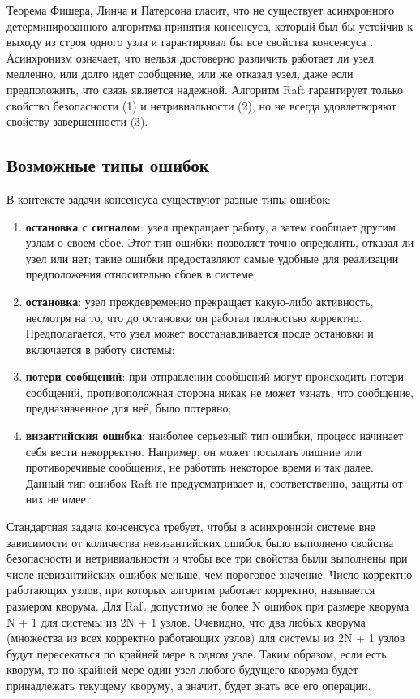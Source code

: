 \documentclass[subf, href, colorlinks=true, 14pt,
times, mtpro, specialist]{disser}
\theoremstyle{definition}
\begin{document}
Теорема Фишера, Линча и Патерсона гласит, что не существует асинхронного детерминированного алгоритма принятия консенсуса, который был бы устойчив к выходу из строя одного узла и гарантировал бы все свойства консенсуса \cite{Theorem_FLP}. Асинхронизм означает, что нельзя достоверно различить работает ли узел медленно, или долго идет сообщение, или же отказал узел, даже если предположить, что связь является надежной. Алгоритм Raft гарантирует только свойство безопасности (1) и нетривиальности (2), но не всегда удовлетворяют свойству завершенности (3).

\subsection{Возможные типы ошибок}

В контексте задачи консенсуса существуют разные типы ошибок:
\begin{enumerate}
\item \textbf{остановка с сигналом}: узел прекращает работу, а затем сообщает другим узлам о своем сбое. Этот тип ошибки позволяет точно определить, отказал ли узел или нет; такие ошибки предоставляют самые удобные для реализации предположения относительно сбоев в системе;

\item \textbf{остановка}: узел преждевременно прекращает какую-либо активность, несмотря на то, что до остановки он работал полностью корректно. Предполагается, что узел может восстанавливается после остановки и включается в работу системы;

\item \textbf{потери сообщений}: при отправлении сообщений могут происходить потери сообщений, противоположная сторона никак не может узнать, что сообщение, предназначенное для неё, было потеряно;

\item \textbf{византийския ошибка}: наиболее серьезный тип ошибки, процесс начинает себя вести некорректно. Например, он может посылать лишние или противоречивые сообщения, не работать некоторое время и так далее. Данный тип ошибок Raft не предусматривает и, соответственно, защиты от них не имеет. 
\end{enumerate}

Стандартная задача консенсуса требует, чтобы в асинхронной системе вне зависимости от количества невизантийских ошибок было выполнено свойства безопасности и нетривиальности и чтобы все три свойства были выполнены при числе невизантийских ошибок меньше, чем пороговое значение. Число корректно работающих узлов, при которых алгоритм работает корректно, называется размером кворума. Для Raft допустимо не более N ошибок при размере кворума N + 1 для системы из 2N + 1 узлов. Очевидно, что два любых кворума (множества из всех корректно работающих узлов) для системы из 2N + 1 узлов будут пересекаться по крайней мере в одном узле. Таким образом, если есть кворум, то по крайней мере один узел любого будущего кворума будет принадлежать текущему кворуму, а значит, будет знать все его операции. 
\end{document}
